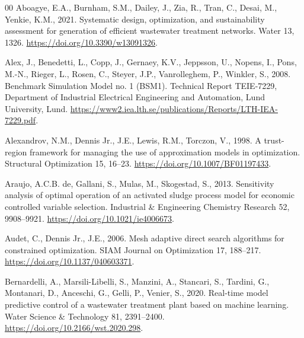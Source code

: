 \documentclass[a4paper,fleqn]{cas-sc}
\begin{document}
\begin{thebibliography}{00}
Aboagye, E.A., Burnham, S.M., Dailey, J., Zia, R., Tran, C., Desai, M., Yenkie, K.M., 2021. Systematic design, optimization, and sustainability assessment for generation of efficient wastewater treatment networks. Water 13, 1326. \url{https://doi.org/10.3390/w13091326}.

Alex, J., Benedetti, L., Copp, J., Gernaey, K.V., Jeppsson, U., Nopens, I., Pons, M.-N., Rieger, L., Rosen, C., Steyer, J.P., Vanrolleghem, P., Winkler, S., 2008. Benchmark Simulation Model no. 1 (BSM1). Technical Report TEIE-7229, Department of Industrial Electrical Engineering and Automation, Lund University, Lund. \url{https://www2.iea.lth.se/publications/Reports/LTH-IEA-7229.pdf}.

Alexandrov, N.M., Dennis Jr., J.E., Lewis, R.M., Torczon, V., 1998. A trust-region framework for managing the use of approximation models in optimization. Structural Optimization 15, 16--23. \url{https://doi.org/10.1007/BF01197433}.

Araujo, A.C.B. de, Gallani, S., Mulas, M., Skogestad, S., 2013. Sensitivity analysis of optimal operation of an activated sludge process model for economic controlled variable selection. Industrial \& Engineering Chemistry Research 52, 9908--9921. \url{https://doi.org/10.1021/ie4006673}.

Audet, C., Dennis Jr., J.E., 2006. Mesh adaptive direct search algorithms for constrained optimization. SIAM Journal on Optimization 17, 188--217. \url{https://doi.org/10.1137/040603371}.

Bernardelli, A., Marsili-Libelli, S., Manzini, A., Stancari, S., Tardini, G., Montanari, D., Anceschi, G., Gelli, P., Venier, S., 2020. Real-time model predictive control of a wastewater treatment plant based on machine learning. Water Science \& Technology 81, 2391--2400. \url{https://doi.org/10.2166/wst.2020.298}.


\end{thebibliography}
\end{document}
